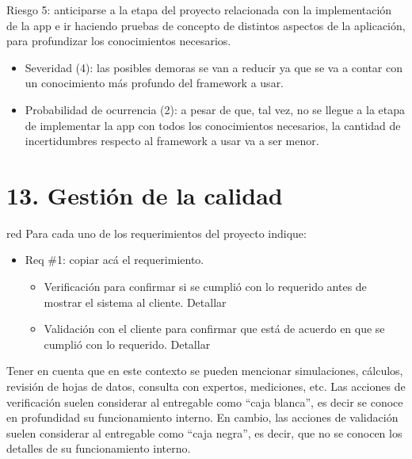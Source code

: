 \documentclass[
11pt, %
codirector, %
]{charter}
\begin{document}
Riesgo 5: anticiparse a la etapa del proyecto relacionada con la implementación de la app e ir haciendo pruebas de concepto de distintos aspectos de la aplicación,  para profundizar los conocimientos necesarios.
\begin{itemize}
  \item Severidad (4): las posibles demoras se van a reducir ya que se va a contar con un conocimiento más profundo del framework a usar.
  \item Probabilidad de ocurrencia (2): a pesar de que, tal vez, no se llegue a la etapa de implementar la app con todos los conocimientos necesarios, la cantidad de incertidumbres respecto al framework a usar va a ser menor. 
\end{itemize} 



\section{13. Gestión de la calidad}
\label{sec:calidad}

\begin{consigna}{red}
Para cada uno de los requerimientos del proyecto indique:
\begin{itemize} 
\item Req \#1: copiar acá el requerimiento.

\begin{itemize}
	\item Verificación para confirmar si se cumplió con lo requerido antes de mostrar el sistema al cliente. Detallar 
	\item Validación con el cliente para confirmar que está de acuerdo en que se cumplió con lo requerido. Detallar  
\end{itemize}

\end{itemize}

Tener en cuenta que en este contexto se pueden mencionar simulaciones, cálculos, revisión de hojas de datos, consulta con expertos, mediciones, etc.  Las acciones de verificación suelen considerar al entregable como ``caja blanca'', es decir se conoce en profundidad su funcionamiento interno.  En cambio, las acciones de validación suelen considerar al entregable como ``caja negra'', es decir, que no se conocen los detalles de su funcionamiento interno.

\end{consigna}
\end{document}
